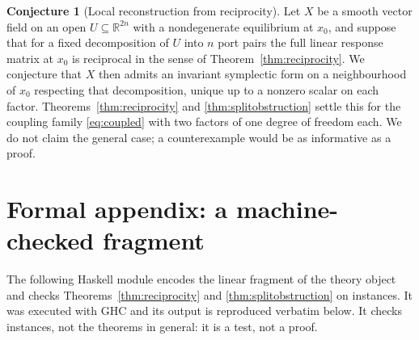 \documentclass[10pt,a4paper]{article}
\theoremstyle{plain}
\theoremstyle{definition}
\newtheorem{conjecture}[theorem]{Conjecture}
\newcommand{\R}{\mathbb{R}}
\begin{document}
\begin{conjecture}[Local reconstruction from reciprocity]
\label{conj:reciprocity}
Let $X$ be a smooth vector field on an open $U\subseteq\R^{2n}$ with a nondegenerate equilibrium at $x_0$, and suppose that for a fixed decomposition of $U$ into $n$ port pairs the full linear response matrix at $x_0$ is reciprocal in the sense of Theorem~\ref{thm:reciprocity}. We conjecture that $X$ then admits an invariant symplectic form on a neighbourhood of $x_0$ respecting that decomposition, unique up to a nonzero scalar on each factor. Theorems~\ref{thm:reciprocity} and \ref{thm:splitobstruction} settle this for the coupling family \eqref{eq:coupled} with two factors of one degree of freedom each. We do not claim the general case; a counterexample would be as informative as a proof.
\end{conjecture}

\section{Formal appendix: a machine-checked fragment}
\label{sec:haskell}

The following Haskell module encodes the linear fragment of the theory object and checks Theorems~\ref{thm:reciprocity} and \ref{thm:splitobstruction} on instances. It was executed with GHC and its output is reproduced verbatim below. It checks instances, not the theorems in general: it is a test, not a proof.
\end{document}
